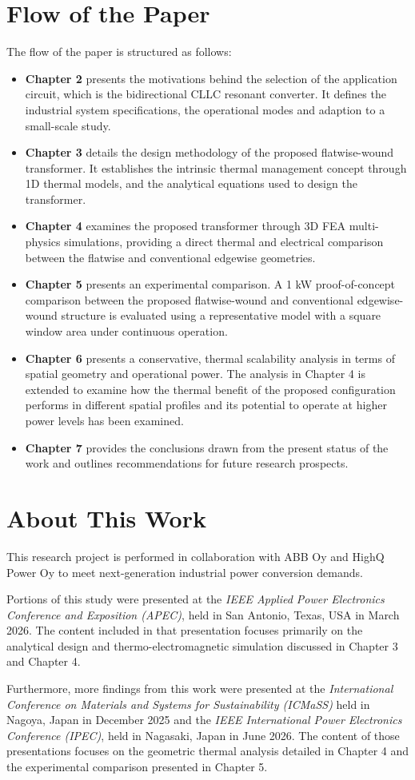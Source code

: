 \section{Flow of the Paper}
The flow of the paper is structured as follows:
\begin{itemize}
\item \textbf{Chapter 2} presents the motivations behind the selection of the application circuit, which is the bidirectional CLLC resonant converter. It defines the industrial system specifications, the operational modes and adaption to a small-scale study.
\item \textbf{Chapter 3} details the design methodology of the proposed flatwise-wound transformer. It establishes the intrinsic thermal management concept through 1D thermal models, and the analytical equations used to design the transformer.
\item \textbf{Chapter 4} examines the proposed transformer through 3D FEA multi-physics simulations, providing a direct thermal and electrical comparison between the flatwise and conventional edgewise geometries.
\item \textbf{Chapter 5} presents an experimental comparison. A 1 kW proof-of-concept comparison between the proposed flatwise-wound and conventional edgewise-wound structure is evaluated using a representative model with a square window area under continuous operation.
\item \textbf{Chapter 6} presents a conservative, thermal scalability analysis in terms of spatial geometry and operational power. The analysis in Chapter 4 is extended to examine how the thermal benefit of the proposed configuration performs in different spatial profiles and its potential to operate at higher power levels has been examined. 
\item \textbf{Chapter 7} provides the conclusions drawn from the present status of the work and outlines recommendations for future research prospects.
\end{itemize}

\section{About This Work}
This research project is performed in collaboration with ABB Oy and HighQ Power Oy to meet next-generation industrial power conversion demands.

Portions of this study were presented at the \textit{IEEE Applied Power Electronics Conference and Exposition (APEC)}, held in San Antonio, Texas, USA in March 2026. The content included in that presentation focuses primarily on the analytical design and thermo-electromagnetic simulation discussed in Chapter 3 and Chapter 4.

Furthermore, more findings from this work were presented at the \textit{International Conference on Materials and Systems for Sustainability (ICMaSS)} held in Nagoya, Japan in December 2025 and the \textit{IEEE International Power Electronics Conference (IPEC)}, held in Nagasaki, Japan in June 2026. The content of those presentations focuses on the geometric thermal analysis detailed in Chapter 4 and the experimental comparison presented in Chapter 5.


